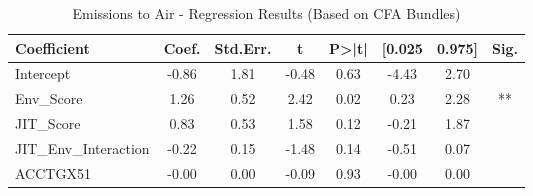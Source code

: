 \begin{table}[htbp]
    \centering
    \caption{Emissions to Air - Regression Results (Based on CFA Bundles)}
    \label{tab:regression}
    \begin{tabular}{lccccccc}
\toprule
Coefficient & Coef. & Std.Err. & t & P>|t| & [0.025 & 0.975] & Sig. \\
\midrule
Intercept & -0.86 & 1.81 & -0.48 & 0.63 & -4.43 & 2.70 &  \\
Env\_Score & 1.26 & 0.52 & 2.42 & 0.02 & 0.23 & 2.28 & ** \\
JIT\_Score & 0.83 & 0.53 & 1.58 & 0.12 & -0.21 & 1.87 &  \\
JIT\_Env\_Interaction & -0.22 & 0.15 & -1.48 & 0.14 & -0.51 & 0.07 &  \\
ACCTGX51 & -0.00 & 0.00 & -0.09 & 0.93 & -0.00 & 0.00 &  \\
\bottomrule
\end{tabular}

    \end{table}
    